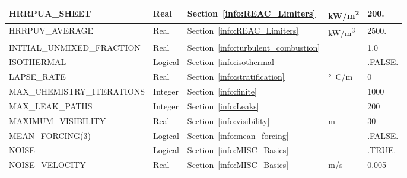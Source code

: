 \documentclass[11pt]{book}
\begin{document}
\begin{longtable}{@{\extracolsep{\fill}}|l|l|l|l|l|}
{\ct HRRPUA\_SHEET}                             & Real          & Section~\ref{info:REAC_Limiters}                      & \si{kW/m^2}   & 200.              \\ \hline
{\ct HRRPUV\_AVERAGE}                           & Real          & Section~\ref{info:REAC_Limiters}                      & \si{kW/m^3}   & 2500.             \\ \hline
{\ct INITIAL\_UNMIXED\_FRACTION}                & Real          & Section~\ref{info:turbulent_combustion}               &               & 1.0               \\ \hline
{\ct ISOTHERMAL}                                & Logical       & Section~\ref{info:isothermal}                         &               & {\ct .FALSE.}     \\ \hline
{\ct LAPSE\_RATE}                               & Real          & Section~\ref{info:stratification}                     & \si{\degree C/m} & 0              \\ \hline
{\ct MAX\_CHEMISTRY\_ITERATIONS}                & Integer       & Section~\ref{info:finite}                             &               &  1000             \\ \hline
{\ct MAX\_LEAK\_PATHS}                          & Integer       & Section~\ref{info:Leaks}                             &               &  200              \\ \hline
{\ct MAXIMUM\_VISIBILITY}                       & Real          & Section~\ref{info:visibility}                         &  m            &  30               \\ \hline
{\ct MEAN\_FORCING(3)}                          & Logical       & Section~\ref{info:mean_forcing}                       &               & {\ct .FALSE.}     \\ \hline
{\ct NOISE}                                     & Logical       & Section~\ref{info:MISC_Basics}                        &               & {\ct .TRUE.}      \\ \hline
{\ct NOISE\_VELOCITY}                           & Real          & Section~\ref{info:MISC_Basics}                        &  m/s          & 0.005             \\ \hline

\end{longtable}
\end{document}

